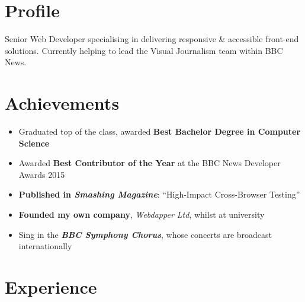 \documentclass[letterpaper]{twentysecondcv} %
\begin{document}
\makeprofile %

\section{Profile}
Senior Web Developer specialising in delivering responsive \& accessible front-end solutions. Currently helping to lead the Visual Journalism team within BBC News.

\section{Achievements}
\begin{itemize}
    \item Graduated top of the class, awarded \textbf{Best Bachelor Degree in Computer Science}

    \item Awarded \textbf{Best Contributor of the Year} at the BBC News Developer Awards 2015

    \item \textbf{Published in \emph{Smashing Magazine}}: ``High-Impact Cross-Browser Testing''

    \item \textbf{Founded my own company}, \emph{Webdapper Ltd}, whilst at university

    \item Sing in the \textbf{\emph{BBC Symphony Chorus}}, whose concerts are broadcast internationally
\end{itemize}


\section{Experience}
\end{document}
